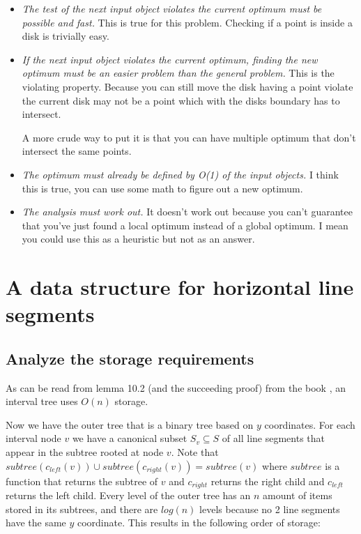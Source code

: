 \documentclass{article}
\begin{document}
\begin{itemize}
	\item \emph{The test of the next input object violates the current
		optimum must be possible and fast.}
		This is true for this problem. Checking if a point is inside a disk
		is trivially easy.
	\item \emph{If the next input object violates the current optimum,
		finding the new optimum must be an easier problem than the general
		problem.}
		This is the violating property. Because you can still move
		the disk having a point violate the current disk may not be a point
		which with the disks boundary has to intersect.

		A more crude way to put it is that you can have multiple optimum
		that don't intersect the same points.
	\item \emph{The optimum must already be defined by O(1) of the input
		objects.}
		I think this is true, you can use some math to figure out a new
		optimum.
	\item \emph{The analysis must work out.}
		It doesn't work out because you can't guarantee that you've just
		found a local optimum instead of a global optimum. I mean you
		could use this as a heuristic but not as an answer.
\end{itemize}
\section{A data structure for horizontal line segments}
\subsection{Analyze the storage requirements}
As can be read from lemma 10.2 (and the succeeding proof) from
the book \cite{book}, an interval tree uses $O(n)$ storage.

Now we have the outer tree that is a binary tree based on $y$ coordinates.
For each interval node $v$ we have a canonical subset $S_v \subseteq S$
of all line segments that appear in the subtree rooted at node $v$.
Note that $subtree(c_{left}(v))\cup subtree(c_{right}(v)) = subtree(v)$
where $subtree$ is a function that returns the subtree of $v$ and 
$c_{right}$ returns the right child and $c_{left}$ returns the left child.
Every level of the outer tree has an $n$ amount of items stored in its
subtrees, and there are $log(n)$ levels because no 2 line segments have the
same $y$ coordinate. This results in the following order of storage:
\end{document}
